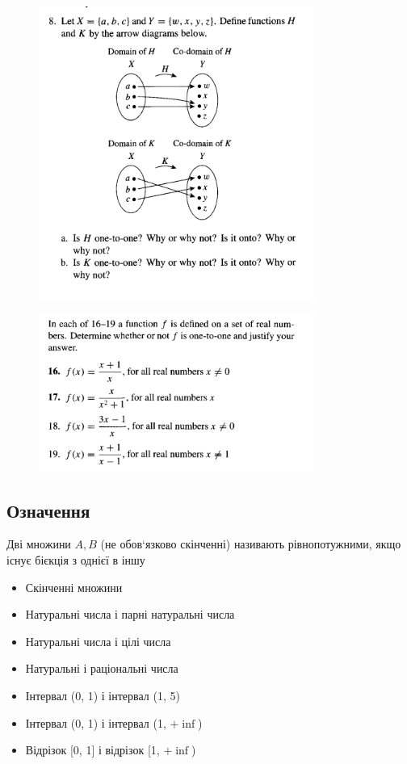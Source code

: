 \documentclass{article}
\begin{document}
\begin{figure}
\centering
\includegraphics[width=90mm]{11}
\end{figure}

\begin{figure}
\centering
\includegraphics[width=90mm]{12}
\end{figure}

\pagebreak
\subsection*{Означення}
Дві множини $A,B$ (не обов`язково скінченні) називають рівнопотужними, якщо існує бієкція з однієї в іншу
\begin{itemize}
    \item Скінченні множини
    \item Натуральні числа і парні натуральні числа
    \item Натуральні числа і цілі числа
    \item Натуральні і раціональні числа
    \item Інтервал (0, 1) і інтервал (1, 5)
    \item Інтервал (0, 1) і інтервал (1, $+\inf$)
    \item Відрізок [0, 1] і відрізок [1, $+\inf$)
\end{itemize}
\end{document}
